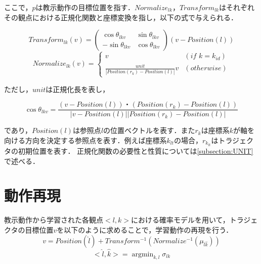 ここで，$p$は教示動作の目標位置を指す．$Normalize_{lk}$，$Transform_{lk}$はそれぞれその観点における正規化関数と座標変換を指し，以下の式で与えられる．

\begin{equation}
	Transform_{lk}(v) = 
	\begin{pmatrix}
        	\cos θ_{lkv} & \sin θ_{lkv} \\
        	-\sin θ_{lkv} & \cos θ_{lkv}
	\end{pmatrix}
	(v-Position(l))
\end{equation}
\begin{equation}
	\label{equation:normalize}
	Normalize_{lk}(v) = 
	\begin{cases}
		v & (if\,\,k=k_{id}) \\
		\frac{unit}{| Position(r_{k})-Position(l) |}v & (otherwise)
	\end{cases}
\end{equation}

ただし，$unit$は正規化長を表し，

\[
	\cos θ_{lkv} = \frac{(v-Position(l))・(Position(r_{k})-Position(l))}{| v-Position(l) || Position(r_{k})-Position(l) |}
\]

であり，$Position(l)$は参照点$l$の位置ベクトルを表す．また$r_{k}$は座標系$k$が軸を向ける方向を決定する参照点を表す．例えば座標系$k_{lt}$の場合，$r_{k_{lt}}$はトラジェクタの初期位置を表す．
正規化関数の必要性と性質については\ref{subsection:UNIT}で述べる．

\section{動作再現}

教示動作から学習された各観点$<l , k>$における確率モデルを用いて，トラジェクタの目標位置$v$を以下のように求めることで，学習動作の再現を行う．
\begin{equation}
	v =  Position(\hat{l}) +Transform^{-1}(Normalize^{-1}(μ_{\hat{l}\hat{k}})) 
\end{equation}
\begin{equation}
	<\hat{l} , \hat{k}> =  \mathop{\arg\min}_{k , l}σ_{lk}
\end{equation}

